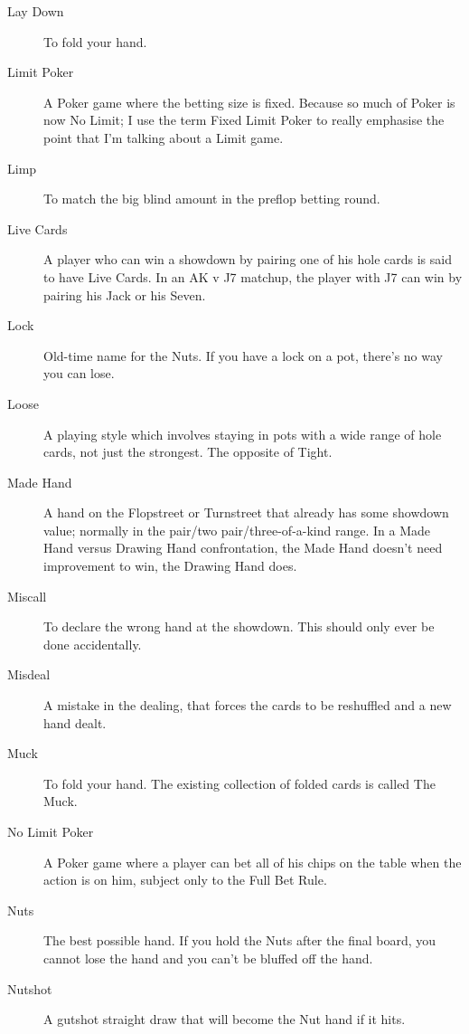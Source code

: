 \begin{description}
\item[Lay Down] To fold your hand.

\item[Limit Poker] A Poker game where the betting size is
fixed. Because so much of Poker is now No Limit; I use the term
Fixed Limit Poker to really emphasise the point that I'm talking about
a Limit game.

\item[Limp] To match the big blind amount in the preflop betting
round.

\item[Live Cards] A player who can win a showdown by pairing one of
his hole cards is said to have Live Cards. In an AK v J7 matchup, the
player with J7 can win by pairing his Jack or his Seven.

\item[Lock] Old-time name for the Nuts. If you have a lock on a pot,
there's no way you can lose.

\item[Loose] A playing style which involves staying in pots with a
wide range of hole cards, not just the strongest. The opposite of
Tight.

\item[Made Hand] A hand on the Flopstreet or Turnstreet that already
has some showdown value; normally in the pair/two pair/three-of-a-kind
range. In a Made Hand versus Drawing Hand confrontation, the Made Hand
doesn't need improvement to win, the Drawing Hand does.

\item[Miscall] To declare the wrong hand at the showdown. This should
only ever be done accidentally.

\item[Misdeal] A mistake in the dealing, that forces the cards to be
reshuffled and a new hand dealt.

\item[Muck] To fold your hand. The existing collection of folded cards
is called The Muck.

\item[No Limit Poker] A Poker game where a player can bet all of his
chips on the table when the action is on him, subject only to the Full
Bet Rule.

\item[Nuts] The best possible hand. If you hold the Nuts
after the final board, you cannot lose the hand and you can't be
bluffed off the hand.

\item[Nutshot] A gutshot straight draw that will become the Nut hand
if it hits.


\end{description}
